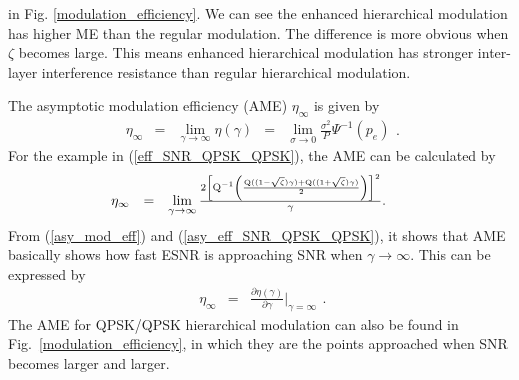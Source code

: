 \documentclass[10pt,fleqn, twocolumn]{IEEEtran}
\begin{document}
in Fig. \ref{modulation_efficiency}. We can see the enhanced
hierarchical modulation has higher ME than the regular modulation.
The difference is more obvious when $\zeta$ becomes large. This
means enhanced hierarchical modulation has stronger inter-layer
interference resistance than regular hierarchical modulation.
\begin{figure}
\end{figure}

The asymptotic modulation efficiency (AME) $\eta_{\infty}$ is
given by
\begin{equation}
\begin{array}{rcccl}
\eta_{\infty}&=&\lim\limits_{\gamma\rightarrow\infty}\eta\left(\gamma\right)&=&\lim\limits_{\sigma\rightarrow0}\frac{\sigma^2}{P}\Psi^{-1}\left(p_{e}\right)
\end{array}.\label{asy_mod_eff}
\end{equation}
\noindent For the example in (\ref{eff_SNR_QPSK_QPSK}), the AME
can be calculated by
\begin{equation}\hspace{-0.225in}
\begin{array}{rcl}
\eta_{\infty}&=&\lim\limits_{\gamma\rightarrow\infty}\frac{2\left[{\rm
Q}^{-1}\left(\frac{{\rm Q}((1-\sqrt{\zeta})\gamma)+{\rm
Q}((1+\sqrt{\zeta})\gamma)}{2}\right)\right]^2}{\gamma}.
\end{array}\label{asy_eff_SNR_QPSK_QPSK}
\end{equation}
\noindent From (\ref{asy_mod_eff}) and
(\ref{asy_eff_SNR_QPSK_QPSK}), it shows that AME basically shows
how fast ESNR is approaching SNR when $\gamma\rightarrow\infty$.
This can be expressed by
\begin{equation}
\begin{array}{rcl}
\eta_{\infty}&=&\frac{\partial\eta\left(\gamma\right)}{\partial\gamma}|_{\gamma=\infty}
\end{array}.\label{asy_mod_eff2}
\end{equation}
\noindent The AME for QPSK/QPSK hierarchical modulation can also
be found in Fig.~\ref{modulation_efficiency}, in which they are
the points approached when SNR becomes larger and larger.
\end{document}
